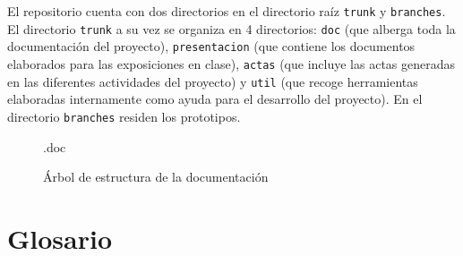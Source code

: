 \documentclass[11pt, a4paper, twoside, titlepage]{article}
\begin{document}
			El repositorio cuenta con dos directorios en el directorio raíz \verb|trunk| y \verb|branches|. El directorio \verb|trunk| a su vez se organiza en 4 directorios: \verb|doc| (que alberga toda la documentación del proyecto), \verb|presentacion| (que contiene los documentos elaborados para las exposiciones en clase), \verb|actas| (que incluye las actas generadas en las diferentes actividades del proyecto) y \verb|util| (que recoge herramientas elaboradas internamente como ayuda para el desarrollo del proyecto). En el directorio \verb|branches| residen los prototipos.

			\begin{figure}[H] \centering
				\tikzset{sibling distance=15pt}
				.doc

			\caption{Árbol de estructura de la documentación}
			\end{figure}

	\section{Glosario}
		\printglossaries

	\newpage
	
	
\end{document}
